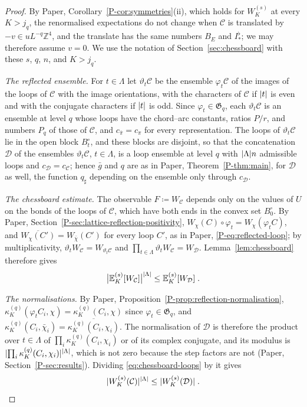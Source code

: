 \documentclass[11pt]{preprint}
\DeclarePairedDelimiter{\abs}{\lvert}{\rvert}
\numberwithin{equation}{section}
\theoremstyle{definition}
\theoremstyle{remark}
\theoremstyle{plain}
\begin{document}
\begin{proof}
By Paper, Corollary~\ref{P-cor:symmetries}(ii), which holds for $W^{(s)}_K$ at every $K > j_q$, the renormalised expectations do not change when $\mathcal C$ is translated by $-v \in uL^{-q}\mathbb Z^4$, and the translate has the same numbers $B_E$ and $I^\flat_*$; we may therefore assume $v = 0$. We use the notation of Section~\ref{sec:chessboard} with these $s$, $q$, $n$, and $K > j_q$.

\emph{The reflected ensemble.} For $t \in \Lambda$ let $\vartheta_t\mathcal C$ be the ensemble $\varphi_t\mathcal C$ of the images of the loops of $\mathcal C$ with the image orientations, with the characters of $\mathcal C$ if $\abs{t}$ is even and with the conjugate characters if $\abs{t}$ is odd. Since $\varphi_t \in \mathfrak G_q$, each $\vartheta_t\mathcal C$ is an ensemble at level $q$ whose loops have the chord--arc constants, ratios $P/r$, and numbers $P_q$ of those of $\mathcal C$, and $c_{\bar\pi} = c_\pi$ for every representation. The loops of $\vartheta_t\mathcal C$ lie in the open block $B^\circ_t$, and these blocks are disjoint, so that the concatenation $\mathcal D$ of the ensembles $\vartheta_t\mathcal C$, $t \in \Lambda$, is a loop ensemble at level $q$ with $\abs{\Lambda}n$ admissible loops and $c_{\mathcal D} = c_{\mathcal C}$; hence $\bar g$ and $q$ are as in Paper, Theorem~\ref{P-thm:main}, for $\mathcal D$ as well, the function $q_\sharp$ depending on the ensemble only through $c_{\mathcal D}$.

\emph{The chessboard estimate.} The observable $F \coloneqq W_{\mathcal C}$ depends only on the values of $U$ on the bonds of the loops of $\mathcal C$, which have both ends in the convex set $B^\circ_0$. By Paper, Section~\ref{P-sec:lattice-reflection-positivity}, $W_\chi(C) \circ \varphi_t = W_\chi(\varphi_tC)$, and $\overline{W_\chi(C')} = W_{\bar\chi}(C')$ for every loop $C'$, as in Paper, \eqref{P-eq:reflected-loop}; by multiplicativity, $\vartheta_tW_{\mathcal C} = W_{\vartheta_t\mathcal C}$ and $\prod_{t \in \Lambda}\vartheta_tW_{\mathcal C} = W_{\mathcal D}$. Lemma~\ref{lem:chessboard} therefore gives
\begin{equation}\label{eq:chessboard-loops}
    \bigl\lvert\mathbb E^{(s)}_K[W_{\mathcal C}]\bigr\rvert^{\abs{\Lambda}} \leq \mathbb E^{(s)}_K[W_{\mathcal D}]\;.
\end{equation}

\emph{The normalisations.} By Paper, Proposition~\ref{P-prop:reflection-normalisation}, $\kappa^{(q)}_K(\varphi_tC_i, \chi) = \kappa^{(q)}_K(C_i, \chi)$ since $\varphi_t \in \mathfrak G_q$, and $\kappa^{(q)}_K(C_i, \bar\chi_i) = \overline{\kappa^{(q)}_K(C_i, \chi_i)}$. The normalisation of $\mathcal D$ is therefore the product over $t \in \Lambda$ of $\prod_i\kappa^{(q)}_K(C_i, \chi_i)$ or of its complex conjugate, and its modulus is $\abs{\prod_i\kappa^{(q)}_K(C_i, \chi_i)}^{\abs{\Lambda}}$, which is not zero because the step factors are not (Paper, Section~\ref{P-sec:results}). Dividing \eqref{eq:chessboard-loops} by it gives
\begin{equation}\label{eq:chessboard-renormalised}
    \abs{W^{(s)}_K(\mathcal C)}^{\abs{\Lambda}} \leq \abs{W^{(s)}_K(\mathcal D)}\;.
\end{equation}


\end{proof}
\end{document}
